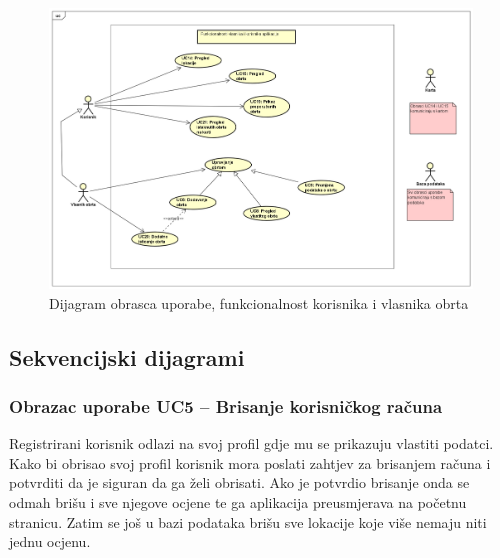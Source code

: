 		    \begin{figure}[H]
			    \includegraphics[width=\textwidth]{slike/dijagram3.png} 
			        \caption{Dijagram obrasca uporabe, funkcionalnost korisnika i vlasnika obrta}
			    \label{fig:Funkcionalnosti korisnika i vlasnika obrta}
		    \end{figure}

      \newpage
            
			\subsection{Sekvencijski dijagrami}
				
                \subsubsection{Obrazac uporabe UC5 – Brisanje korisničkog računa}
                 
                Registrirani korisnik odlazi na svoj profil gdje mu se prikazuju vlastiti podatci. Kako bi obrisao svoj profil korisnik mora poslati zahtjev za brisanjem računa i potvrditi da je siguran da ga želi obrisati. Ako je potvrdio brisanje onda se odmah brišu i sve njegove ocjene te ga aplikacija preusmjerava na početnu stranicu. Zatim se još u bazi podataka brišu sve lokacije koje više nemaju niti jednu ocjenu. 
               

